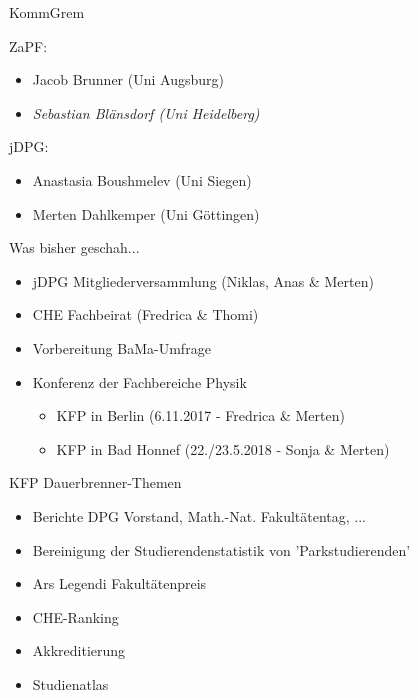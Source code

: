 \documentclass[compress, aspectratio=169]{beamer}
\begin{document}
 \begin{frame}{KommGrem}
  
  ZaPF:
  \begin{itemize}
   \item Jacob Brunner (Uni Augsburg)
   \item \textit{Sebastian Blänsdorf (Uni Heidelberg)}
  \end{itemize}
  
  jDPG:
  \begin{itemize}
   \item Anastasia Boushmelev (Uni Siegen)
   \item Merten Dahlkemper (Uni Göttingen)
  \end{itemize}

 \end{frame}
 

 \begin{frame}{Was bisher geschah...}
  \begin{itemize}
   \item jDPG Mitgliederversammlung (Niklas, Anas \& Merten)
   \item CHE Fachbeirat (Fredrica \& Thomi)
   \item Vorbereitung BaMa-Umfrage
   \item Konferenz der Fachbereiche Physik
   \begin{itemize}
    \item KFP in Berlin (6.11.2017 - Fredrica \& Merten)
    \item KFP in Bad Honnef (22./23.5.2018 - Sonja \& Merten)
   \end{itemize}
  \end{itemize}
 \end{frame}
 
 
 \begin{frame}{KFP Dauerbrenner-Themen}
  \begin{itemize}
   \item Berichte DPG Vorstand, Math.-Nat. Fakultätentag, ... 
   \item Bereinigung der Studierendenstatistik von 'Parkstudierenden'
   \item Ars Legendi Fakultätenpreis
   \item CHE-Ranking
   \item Akkreditierung
   \item Studienatlas
  \end{itemize}
 \end{frame}
 
\end{document}
